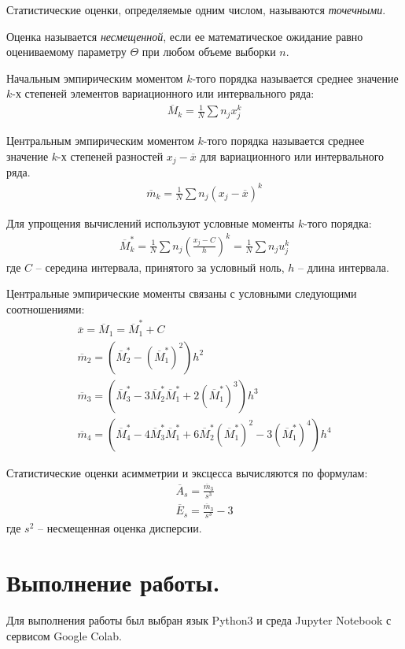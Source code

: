 Статистические оценки, определяемые одним числом, называются \textit{точечными}.

Оценка называется \textit{несмещенной}, если ее математическое ожидание равно
оцениваемому параметру $\Theta$ при любом объеме выборки $n$.

Начальным эмпирическим моментом $k$-того порядка называется среднее значение
$k$-х степеней элементов вариационного или интервального ряда:
\begin{gather*}
    \overline{M}_k = \frac{1}{N} \sum n_j x_j^k
\end{gather*}

Центральным эмпирическим моментом $k$-того порядка называется среднее значение
$k$-х степеней разностей $x_j - \overline{x}$ для вариационного или интервального
ряда.
\begin{gather*}
    \overline{m}_k = \frac{1}{N} \sum n_j (x_j - \overline{x})^k
\end{gather*}

Для упрощения вычислений используют условные моменты $k$-того порядка:
\begin{gather*}
    \overline{M}_k^* = \frac{1}{N} \sum n_j (\frac{x_j - C}{h})^k
    = \frac{1}{N} \sum n_j u_j^k
\end{gather*}
где $C$ -- середина интервала, принятого за условный ноль, $h$ -- длина интервала.

Центральные эмпирические моменты связаны с условными следующими соотношениями:
\begin{gather*}
    \overline{x} = \overline{M}_1 = \overline{M}_1^* + C \\
    \overline{m}_2 = (\overline{M}_2^* - (\overline{M}_1^*)^2) h^2 \\
    \overline{m}_3 = (\overline{M}_3^* - 3\overline{M}_2^* \overline{M}_1^*
    + 2(\overline{M}_1^*)^3)h^3 \\
    \overline{m}_4 = (\overline{M}_4^* - 4 \overline{M}_3^*\overline{M}_1^*
    + 6\overline{M}_2^* (\overline{M}_1^*)^2 - 3(\overline{M}_1^*)^4)h^4
\end{gather*}

Статистические оценки асимметрии и эксцесса вычисляются по формулам:
\begin{gather*}
    \overline{A}_s = \frac{\overline{m}_3}{s^3} \\
    \overline{E}_s = \frac{\overline{m}_3}{s^3} - 3
\end{gather*}
где $s^2$ -- несмещенная оценка дисперсии.

\section*{Выполнение работы.}
Для выполнения работы был выбран язык Python3 и среда Jupyter Notebook с сервисом
Google Colab.

